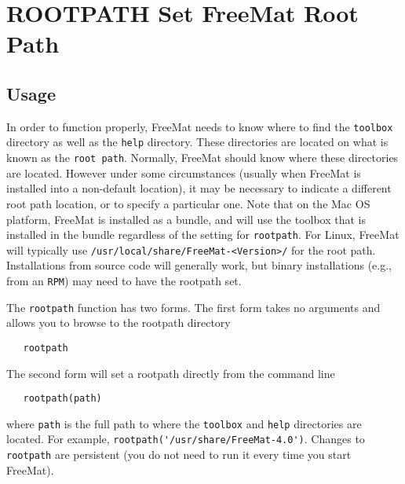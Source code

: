 \section{ROOTPATH Set FreeMat Root Path}

\subsection{Usage}

In order to function properly, FreeMat needs to know where to
find the \verb|toolbox| directory as well as the \verb|help| directory.
These directories are located on what is known as the \verb|root path|.
Normally, FreeMat should know where these directories are located.
However under some circumstances (usually when FreeMat is installed
into a non-default location), it may be necessary to indicate
a different root path location, or to specify a particular one.
Note that on the Mac OS platform, FreeMat is installed as a bundle,
and will use the toolbox that is installed in the bundle regardless of
the setting for \verb|rootpath|.
For Linux, FreeMat will typically use \verb|/usr/local/share/FreeMat-<Version>/|
for the root path.  Installations from source code will generally work,
but binary installations (e.g., from an \verb|RPM|) may need to have the
rootpath set.

The \verb|rootpath| function has two forms.  The first form takes no arguments
and allows you to browse to the rootpath directory
\begin{verbatim}
   rootpath
\end{verbatim}
The second form will set a rootpath directly from the command line
\begin{verbatim}
   rootpath(path)
\end{verbatim}
where \verb|path| is the full path to where the \verb|toolbox| and \verb|help| 
directories are located.  For example, \verb|rootpath('/usr/share/FreeMat-4.0')|.
Changes to \verb|rootpath| are persistent (you do not need to run it every
time you start FreeMat).
